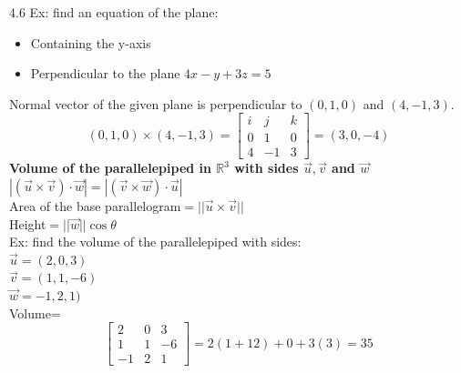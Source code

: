 \documentclass[]{article}
\begin{document}
		4.6 Ex: find an equation of the plane:
		\begin{itemize}
			\item Containing the y-axis
			\item Perpendicular to the plane $4x-y+3z=5$
		\end{itemize}
		Normal vector of the given plane is perpendicular to $(0,1,0)$ and $(4,-1,3)$.
		$$
		(0,1,0)\times(4,-1,3)=
		\begin{bmatrix}
			{i} & {j} & {k}\\
			{0} & {1} & {0}\\
			{4} & {-1} & {3}
		\end{bmatrix}=(3,0,-4)
		$$
		{\bf Volume of the parallelepiped in $\mathbb{R}^3$ with sides $\vec{u}, \vec{v}$ and $\vec{w}$}\\
		$|(\vec{u}\times\vec{v})\cdot\vec{w}|=|(\vec{v}\times\vec{w})\cdot\vec{u}|$\\
		Area of the base parallelogram$=||\vec{u}\times\vec{v}||$\\
		Height$=||\vec{w}||\cos\theta$
		\pagebreak\\
		Ex: find the volume of the parallelepiped with sides:\\
		$\vec{u}=(2,0,3)$\\
		$\vec{v}=(1,1,-6)$\\
		$\vec{w}=-1,2,1)$\\
		Volume=
		$$
		\begin{bmatrix}
			{2} & {0} & {3}\\
			{1} & {1} & {-6}\\
			{-1} & {2} & {1}
		\end{bmatrix}=2(1+12)+0+3(3)=35
		$$
\end{document}
